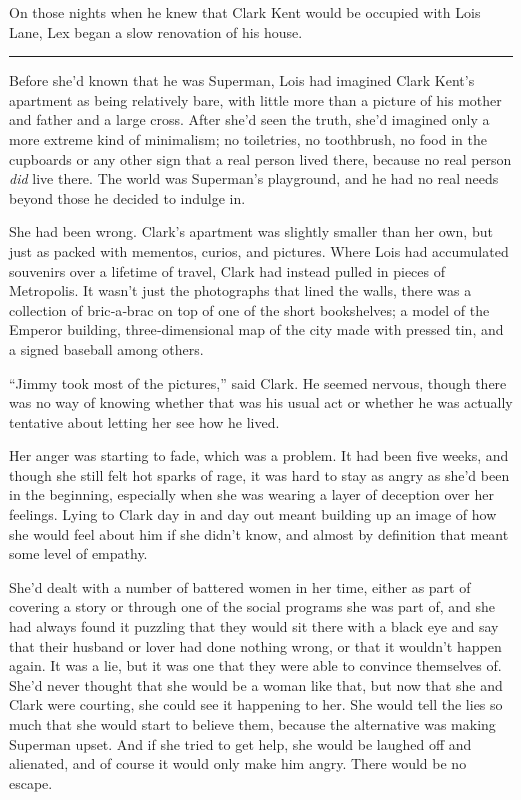 \documentclass[ebook,12pt]{memoir}
\begin{document}
On those nights when he knew that Clark Kent would be occupied with Lois
Lane, Lex began a slow renovation of his house.

\begin{center}\rule{0.5\linewidth}{\linethickness}\end{center}

Before she'd known that he was Superman, Lois had imagined Clark Kent's
apartment as being relatively bare, with little more than a picture of
his mother and father and a large cross. After she'd seen the truth,
she'd imagined only a more extreme kind of minimalism; no toiletries, no
toothbrush, no food in the cupboards or any other sign that a real
person lived there, because no real person \emph{did} live there. The
world was Superman's playground, and he had no real needs beyond those
he decided to indulge in.

She had been wrong. Clark's apartment was slightly smaller than her own,
but just as packed with mementos, curios, and pictures. Where Lois had
accumulated souvenirs over a lifetime of travel, Clark had instead
pulled in pieces of Metropolis. It wasn't just the photographs that
lined the walls, there was a collection of bric‐a‐brac on top of one of
the short bookshelves; a model of the Emperor building,
three‐dimensional map of the city made with pressed tin, and a signed
baseball among others.

``Jimmy took most of the pictures,'' said Clark. He seemed nervous,
though there was no way of knowing whether that was his usual act or
whether he was actually tentative about letting her see how he lived.

Her anger was starting to fade, which was a problem. It had been five
weeks, and though she still felt hot sparks of rage, it was hard to stay
as angry as she'd been in the beginning, especially when she was wearing
a layer of deception over her feelings. Lying to Clark day in and day
out meant building up an image of how she would feel about him if she
didn't know, and almost by definition that meant some level of empathy.

She'd dealt with a number of battered women in her time, either as part
of covering a story or through one of the social programs she was part
of, and she had always found it puzzling that they would sit there with
a black eye and say that their husband or lover had done nothing wrong,
or that it wouldn't happen again. It was a lie, but it was one that they
were able to convince themselves of. She'd never thought that she would
be a woman like that, but now that she and Clark were courting, she
could see it happening to her. She would tell the lies so much that she
would start to believe them, because the alternative was making Superman
upset. And if she tried to get help, she would be laughed off and
alienated, and of course it would only make him angry. There would be no
escape.
\end{document}
